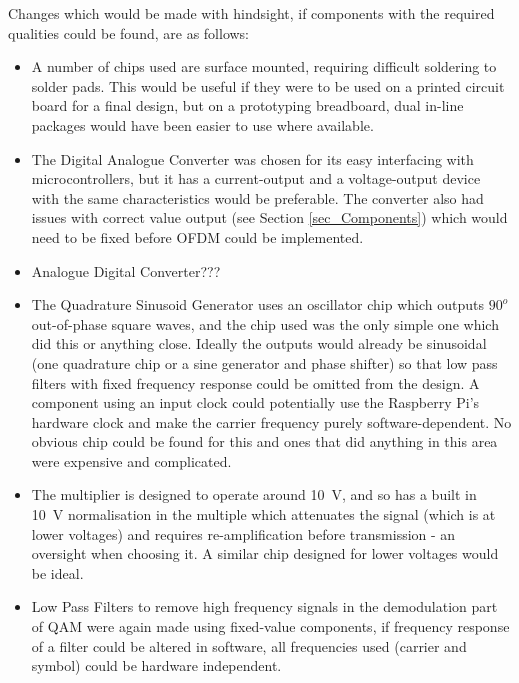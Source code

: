 \documentclass[../main.tex]{subfiles}
\begin{document}
Changes which would be made with hindsight, if components with the required qualities could be found, are as follows:

\begin{itemize}
	\item A number of chips used are surface mounted, requiring difficult soldering to solder pads. This would be useful if they were to be used on a printed circuit board for a final design, but on a prototyping breadboard, dual in-line packages would have been easier to use where available.
	\item The Digital Analogue Converter was chosen for its easy interfacing with microcontrollers, but it has a current-output and a voltage-output device with the same characteristics would be preferable. The converter also had issues with correct value output (see Section \ref{sec_Components}) which would need to be fixed before OFDM could be implemented.
	\item Analogue Digital Converter???
	\item The Quadrature Sinusoid Generator uses an oscillator chip which outputs $90^o$ out-of-phase square waves, and the chip used was the only simple one which did this or anything close. Ideally the outputs would already be sinusoidal (one quadrature chip or a sine generator and phase shifter) so that low pass filters with fixed frequency response could be omitted from the design. A component using an input clock could potentially use the Raspberry Pi's hardware clock and make the carrier frequency purely software-dependent. No obvious chip could be found for this and ones that did anything in this area were expensive and complicated.
	\item The multiplier is designed to operate around \SI{10}{\volt}, and so has a built in \SI{10}{\volt} normalisation in the multiple which attenuates the signal (which is at lower voltages) and requires re-amplification before transmission - an oversight when choosing it. A similar chip designed for lower voltages would be ideal.
	\item Low Pass Filters to remove high frequency signals in the demodulation part of QAM were again made using fixed-value components, if frequency response of a filter could be altered in software, all frequencies used (carrier and symbol) could be hardware independent.
\end{itemize}
\end{document}
